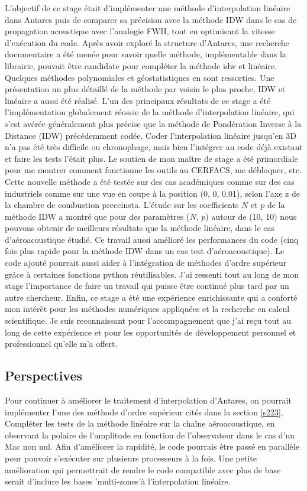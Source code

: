 L'objectif de ce stage était d'implémenter une méthode d'interpolation linéaire dans Antares puis de comparer sa précision avec la méthode IDW dans le cas de propagation acoustique avec l'analogie FWH, tout en optimisant la vitesse d'exécution du code.
Après avoir exploré la structure d'Antares, une recherche documentaire a été menée pour savoir quelle méthode, implémentable dans la librairie, pouvait être candidate pour compléter la méthode idw et linéaire. Quelques méthodes polynomiales et géostatistiques en sont ressorties. Une présentation un plus détaillé de la méthode par voisin le plus proche, IDW et linéaire a aussi été réalisé.
L'un des principaux résultats de ce stage a été l'implémentation globalement réussie de la méthode d'interpolation linéaire, qui s'est avérée généralement plus précise que la méthode de Pondération Inverse à la Distance (IDW) précédemment codée.
Coder l'interpolation linéaire jusqu'en 3D n'a pas été très difficile ou chronophage, mais bien l'intégrer au code déjà existant et faire les tests l'était plus. Le soutien de mon maître de stage a été primordiale pour me montrer comment fonctionne les outils au CERFACS, me débloquer, etc.
Cette nouvelle méthode a été testée sur des cas académiques comme sur des cas industriels comme sur une vue en coupe à la position (0, 0, 0.01), selon l'axe z de la chambre de combustion preccinsta.
L'étude sur les coefficients \(N\) et \(p\) de la méthode IDW a montré que pour des paramètres (\(N\), \(p\)) autour de (10, 10) nous pouvons obtenir de meilleurs résultats que la méthode linéaire, dans le cas d'aéroacoustique étudié.
Ce travail aussi amélioré les performances du code (cinq fois plus rapide pour la méthode IDW dans un cas test d'aéroacoustique).
Le code ajouté pourrait aussi aider à l'intégration de méthodes d'ordre supérieur grâce à certaines fonctions python réutilisables.
J'ai ressenti tout au long de mon stage l'importance de faire un travail qui puisse être continué plus tard par un autre chercheur.
Enfin, ce stage a été une expérience enrichissante qui a conforté mon intérêt pour les méthodes numériques appliquées et la recherche en calcul scientifique. Je suis reconnaissant pour l'accompagnement que j'ai reçu tout au long de cette expérience et pour les opportunités de développement personnel et professionnel qu'elle m'a offert.

\subsection*{Perspectives}
Pour continuer à améliorer le traitement d'interpolation d'Antares, on pourrait implémenter l'une des méthode d'ordre supérieur cités dans la section \ref{s223}.
Compléter les tests de la méthode linéaire sur la chaîne aéroacoustique, en observant la polaire de l'amplitude en fonction de l'observateur dans le cas d'un Mac non nul.
Afin d'améliorer la rapidité, le code pourrais être passé en parallèle pour pouvoir s’exécuter sur plusieurs processeurs à la fois.
Une petite amélioration qui permettrait de rendre le code compatible avec plus de base serait d'inclure les bases 'multi-zones'à l'interpolation linéaire.



